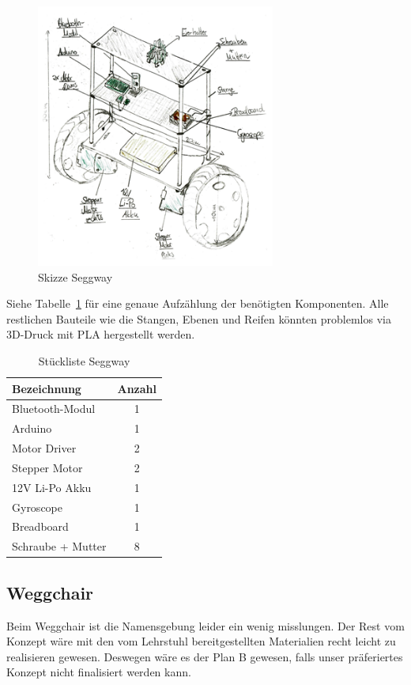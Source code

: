 \begin{figure}[!ht]
	\centering
	\includegraphics[width=0.7\textwidth]{bilder/seggway.png}
	\caption{Skizze Seggway}
	\label{bild:seggway}
\end{figure}

Siehe Tabelle~\ref{table:seggway} für eine genaue Aufzählung der benötigten Komponenten. 
Alle restlichen Bauteile wie die Stangen, Ebenen und Reifen könnten problemlos via 3D-Druck mit PLA hergestellt werden.

\begin{table}[!ht]
	\centering
\begin{tabular}{lc}
	Bezeichnung & Anzahl \\
	\midrule[2pt]
	Bluetooth-Modul & 1\\
	\midrule
	Arduino & 1 \\
	\midrule
	Motor Driver & 2 \\
	\midrule
	Stepper Motor & 2 \\
	\midrule
	12V Li-Po Akku & 1 \\
	\midrule
	Gyroscope & 1 \\
	\midrule
	Breadboard & 1 \\
	\midrule
	Schraube + Mutter & 8 \\

\end{tabular} 
\caption{Stückliste Seggway} 
\label{table:seggway}
\end{table} 


\subsection{Weggchair}
Beim Weggchair ist die Namensgebung leider ein wenig misslungen. 
Der Rest vom Konzept wäre mit den vom Lehrstuhl bereitgestellten Materialien recht leicht zu realisieren gewesen.
Deswegen wäre es der Plan B gewesen, falls unser präferiertes Konzept nicht finalisiert werden kann. 

